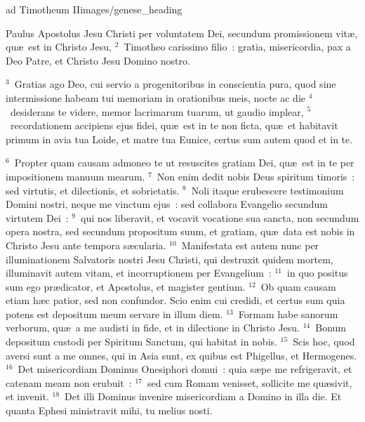 {ad Timotheum II}{images/genese_heading}


\lettrine[lines=10,image=true,loversize=0.05,lraise=-0.03]{P}{}aulus Apostolus Jesu Christi per voluntatem Dei, secundum promissionem vit\ae , qu\ae\ est in Christo Jesu,
${}^{2}$~Timotheo carissimo filio~: gratia, misericordia, pax a Deo Patre, et Christo Jesu Domino nostro.


${}^{3}$~Gratias ago Deo, cui servio a progenitoribus in conscientia pura, quod sine intermissione habeam tui memoriam in orationibus meis, nocte ac die
${}^{4}$~desiderans te videre, memor lacrimarum tuarum, ut gaudio implear,
${}^{5}$~recordationem accipiens ejus fidei, qu\ae\ est in te non ficta, qu\ae\ et habitavit primum in avia tua Loide, et matre tua Eunice, certus sum autem quod et in te.


${}^{6}$~Propter quam causam admoneo te ut resuscites gratiam Dei, qu\ae\ est in te per impositionem manuum mearum.
${}^{7}$~Non enim dedit nobis Deus spiritum timoris~: sed virtutis, et dilectionis, et sobrietatis.
${}^{8}$~Noli itaque erubescere testimonium Domini nostri, neque me vinctum ejus~: sed collabora Evangelio secundum virtutem Dei~:
${}^{9}$~qui nos liberavit, et vocavit vocatione sua sancta, non secundum opera nostra, sed secundum propositum suum, et gratiam, qu\ae\ data est nobis in Christo Jesu ante tempora s\ae cularia.
${}^{10}$~Manifestata est autem nunc per illuminationem Salvatoris nostri Jesu Christi, qui destruxit quidem mortem, illuminavit autem vitam, et incorruptionem per Evangelium~:
${}^{11}$~in quo positus sum ego pr\ae dicator, et Apostolus, et magister gentium.
${}^{12}$~Ob quam causam etiam h\ae c patior, sed non confundor. Scio enim cui credidi, et certus sum quia potens est depositum meum servare in illum diem.
${}^{13}$~Formam habe sanorum verborum, qu\ae\ a me audisti in fide, et in dilectione in Christo Jesu.
${}^{14}$~Bonum depositum custodi per Spiritum Sanctum, qui habitat in nobis.
${}^{15}$~Scis hoc, quod aversi sunt a me omnes, qui in Asia sunt, ex quibus est Phigellus, et Hermogenes.
${}^{16}$~Det misericordiam Dominus Onesiphori domui~: quia s\ae pe me refrigeravit, et catenam meam non erubuit~:
${}^{17}$~sed cum Romam venisset, sollicite me qu\ae sivit, et invenit.
${}^{18}$~Det illi Dominus invenire misericordiam a Domino in illa die. Et quanta Ephesi ministravit mihi, tu melius nosti.

